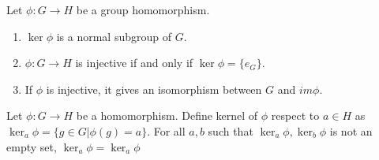 \documentclass[../note.tex]{subfiles}
\begin{document}
\begin{theorem}
	Let $\phi : G \rightarrow H$ be a group homomorphism.
\begin{enumerate}
	\item $\ker{\phi}$ is a normal subgroup of $G$. 
	\item $\phi: G \rightarrow H$ is injective if and only if $\ker{\phi} = \{e_{G}\}$.
	\item If $\phi$ is injective, it gives an isomorphism between $G$ and $im{\phi}$.
\end{enumerate}
\end{theorem}

\begin{hypothesis}
	Let $\phi: G \rightarrow H$ be a homomorphism.
	Define kernel of $\phi$ respect to $a \in H$ as $\ker_a{\phi}=\{g\in G| \phi(g)=a\}$.
	For all $a, b$ such that $\ker_a{\phi}, \ker_b{\phi}$ is not an empty set, $\ker_a{\phi}=\ker_a{\phi}$ 
\end{hypothesis}
\end{document}
